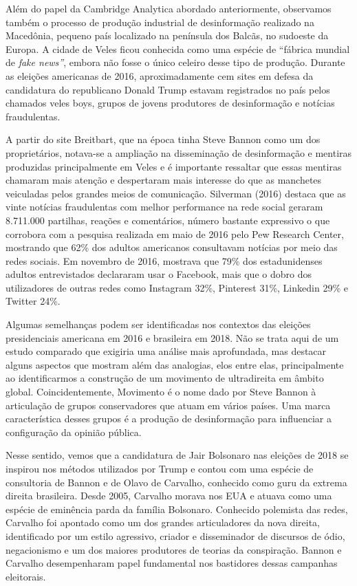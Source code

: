 Além do papel da Cambridge Analytica abordado anteriormente, observamos
também o processo de produção industrial de desinformação realizado na
Macedônia, pequeno país localizado na península dos Balcãs, no sudoeste
da Europa. A cidade de Veles ficou conhecida como uma espécie de
``fábrica mundial de \emph{fake news''}, embora não fosse o único
celeiro desse tipo de produção. Durante as eleições americanas de 2016,
aproximadamente cem sites em defesa da candidatura do republicano Donald
Trump estavam registrados no país pelos chamados veles boys, grupos de
jovens produtores de desinformação e notícias fraudulentas.

A partir do site Breitbart, que na época tinha Steve Bannon como um dos
proprietários, notava-se a ampliação na disseminação de desinformação e
mentiras produzidas principalmente em Veles e é importante ressaltar que
essas mentiras chamaram mais atenção e despertaram mais interesse do que
as manchetes veiculadas pelos grandes meios de comunicação. Silverman
(2016) destaca que as vinte notícias fraudulentas com melhor performance
na rede social geraram 8.711.000 partilhas, reações e comentários,
número bastante expressivo o que corrobora com a pesquisa realizada em
maio de 2016 pelo Pew Research Center, mostrando que 62\% dos adultos
americanos consultavam notícias por meio das redes sociais. Em novembro
de 2016, mostrava que 79\% dos estadunidenses adultos entrevistados
declararam usar o Facebook, mais que o dobro dos utilizadores de outras
redes como Instagram 32\%, Pinterest 31\%, Linkedin 29\% e Twitter 24\%.

Algumas semelhanças podem ser identificadas nos contextos das eleições
presidenciais americana em 2016 e brasileira em 2018. Não se trata aqui
de um estudo comparado que exigiria uma análise mais aprofundada, mas
destacar alguns aspectos que mostram além das analogias, elos entre
elas, principalmente ao identificarmos a construção de um movimento de
ultradireita em âmbito global. Coincidentemente, Movimento é o nome dado
por Steve Bannon à articulação de grupos conservadores que atuam em
vários países. Uma marca característica desses grupos é a produção de
desinformação para influenciar a configuração da opinião pública.

Nesse sentido, vemos que a candidatura de Jair Bolsonaro nas eleições de
2018 se inspirou nos métodos utilizados por Trump e contou com uma
espécie de consultoria de Bannon e de Olavo de Carvalho, conhecido como
guru da extrema direita brasileira. Desde 2005, Carvalho morava nos EUA
e atuava como uma espécie de eminência parda da família Bolsonaro.
Conhecido polemista das redes, Carvalho foi apontado como um dos grandes
articuladores da nova direita, identificado por um estilo agressivo,
criador e disseminador de discursos de ódio, negacionismo e um dos
maiores produtores de teorias da conspiração. Bannon e Carvalho
desempenharam papel fundamental nos bastidores dessas campanhas
eleitorais.


